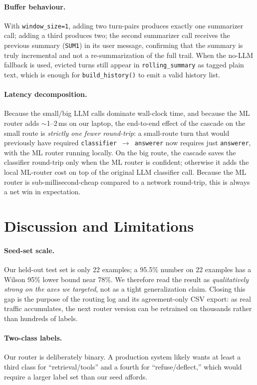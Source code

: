 \documentclass{article}
\begin{document}
\paragraph{Buffer behaviour.} With \texttt{window\_size=1}, adding two
turn-pairs produces exactly one summarizer call; adding a third produces
two; the second summarizer call receives the previous summary (\texttt{SUM1})
in its user message, confirming that the summary is truly incremental and
not a re-summarization of the full trail. When the no-LLM fallback is used,
evicted turns still appear in \texttt{rolling\_summary} as tagged plain text,
which is enough for \texttt{build\_history()} to emit a valid history list.

\paragraph{Latency decomposition.} Because the small/big LLM calls dominate
wall-clock time, and because the ML router adds $\sim$1--2\,ms on our laptop,
the end-to-end effect of the cascade on the small route is
\emph{strictly one fewer round-trip}: a small-route turn that would
previously have required \texttt{classifier $\rightarrow$ answerer} now
requires just \texttt{answerer}, with the ML router running locally. On
the big route, the cascade saves the classifier round-trip only when the ML
router is confident; otherwise it adds the local ML-router cost on top of
the original LLM classifier call. Because the ML router is
sub-millisecond-cheap compared to a network round-trip, this is always a
net win in expectation.

\section{Discussion and Limitations}
\label{sec:limits}

\paragraph{Seed-set scale.} Our held-out test set is only 22 examples; a
95.5\% number on 22 examples has a Wilson 95\% lower bound near 78\%. We
therefore read the result as \emph{qualitatively strong on the axes we
targeted}, not as a tight generalization claim. Closing this gap is the
purpose of the routing log and its agreement-only CSV export: as real
traffic accumulates, the next router version can be retrained on thousands
rather than hundreds of labels.

\paragraph{Two-class labels.} Our router is deliberately binary. A
production system likely wants at least a third class for
``retrieval/tools'' and a fourth for ``refuse/deflect,'' which would require
a larger label set than our seed affords.
\end{document}
